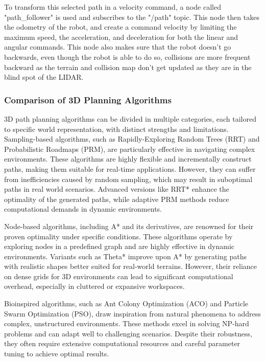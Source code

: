 \documentclass[12pt]{article}
\begin{document}

        To transform this selected path in a velocity command, a node called "path\_follower" is used and subscribes to the "/path" topic. This node then takes the odometry of the robot, and create a command velocity by limiting the maximum speed, the acceleration, and deceleration for both the linear and angular commands. This node also makes sure that the robot doesn't go backwards, even though the robot is able to do so, collisions are more frequent backward as the terrain and collision map don't get updated as they are in the blind spot of the LIDAR.
        
        
        \subsubsection{Comparison of 3D Planning Algorithms}

        3D path planning algorithms can be divided in multiple categories, each tailored to specific world representation, with distinct strengths and limitations. Sampling-based algorithms, such as Rapidly-Exploring Random Trees \cite{lavalle1998rapidly} (RRT) and Probabilistic Roadmaps\cite{kavraki1996probabilistic} (PRM), are particularly effective in navigating complex environments. These algorithms are highly flexible and incrementally construct paths, making them suitable for real-time applications. However, they can suffer from inefficiencies caused by random sampling, which may result in suboptimal paths in real world scenarios. Advanced versions like RRT* \cite{islam2012rrt} enhance the optimality of the generated paths, while adaptive PRM methods reduce computational demands in dynamic environments.
        
        Node-based algorithms, including A* and its derivatives, are renowned for their proven optimality under specific conditions. These algorithms operate by exploring nodes in a predefined graph and are highly effective in dynamic environments. Variants such as Theta* improve upon A* by generating paths with realistic shapes better suited for real-world terrains. However, their reliance on dense grids for 3D environments can lead to significant computational overhead, especially in cluttered or expansive workspaces.
        
        Bioinspired algorithms, such as Ant Colony Optimization \cite{brand2010ant} (ACO) and Particle Swarm Optimization \cite{kang2008path} (PSO), draw inspiration from natural phenomena to address complex, unstructured environments. These methods excel in solving NP-hard problems and can adapt well to challenging scenarios. Despite their robustness, they often require extensive computational resources and careful parameter tuning to achieve optimal results.
        
\end{document}

